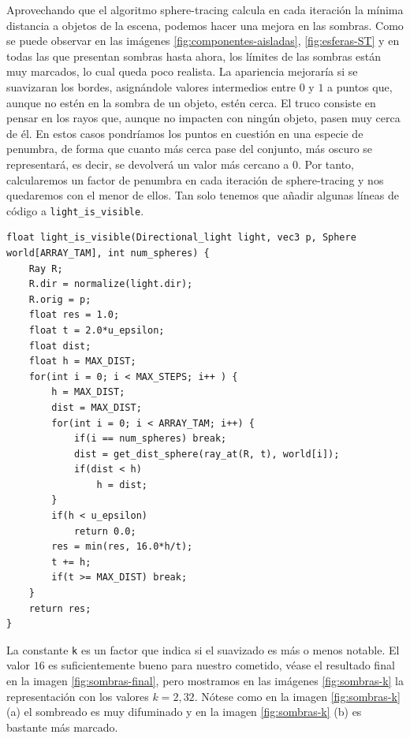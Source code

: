 Aprovechando que el algoritmo sphere-tracing calcula en cada iteración la mínima distancia a objetos de la escena, podemos hacer una mejora en las sombras. Como se puede observar en las imágenes \ref{fig:componentes-aisladas}, \ref{fig:esferas-ST} y en todas las que presentan sombras hasta ahora, los límites de las sombras están muy marcados, lo cual queda poco realista. La apariencia mejoraría si se suavizaran los bordes, asignándole valores intermedios entre $0$ y $1$ a puntos que, aunque no estén en la sombra de un objeto, estén cerca. El truco consiste en pensar en los rayos que, aunque no impacten con ningún objeto, pasen muy cerca de él. En estos casos pondríamos los puntos en cuestión en una especie de penumbra, de forma que cuanto más cerca pase del conjunto, más oscuro se representará, es decir, se devolverá un valor más cercano a $0$. Por tanto, calcularemos un factor de penumbra en cada iteración de sphere-tracing y nos quedaremos con el menor de ellos. Tan solo tenemos que añadir algunas líneas de código a \verb|light_is_visible|.

\begin{lstlisting}
float light_is_visible(Directional_light light, vec3 p, Sphere world[ARRAY_TAM], int num_spheres) {
    Ray R;
    R.dir = normalize(light.dir);
    R.orig = p;
    float res = 1.0;
    float t = 2.0*u_epsilon;
    float dist;
    float h = MAX_DIST;
    for(int i = 0; i < MAX_STEPS; i++ ) {
        h = MAX_DIST;
        dist = MAX_DIST;
        for(int i = 0; i < ARRAY_TAM; i++) {
            if(i == num_spheres) break;
            dist = get_dist_sphere(ray_at(R, t), world[i]);
            if(dist < h)
                h = dist;
        }
        if(h < u_epsilon)
            return 0.0;
        res = min(res, 16.0*h/t);
        t += h;
        if(t >= MAX_DIST) break;
    }
    return res;
}
\end{lstlisting}

La constante \verb|k| es un factor que indica si el suavizado es más o menos notable. El valor $16$ es suficientemente bueno para nuestro cometido, véase el resultado final en la imagen \ref{fig:sombras-final}, pero mostramos en las imágenes \ref{fig:sombras-k} la representación con los valores $k=2,32$. Nótese como en la imagen \ref{fig:sombras-k} (a) el sombreado es muy difuminado y en la imagen \ref{fig:sombras-k} (b) es bastante más marcado.

